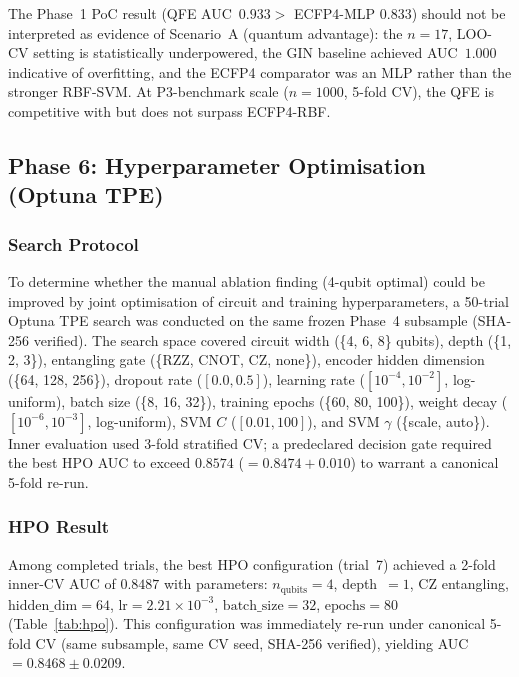 The Phase~1 PoC result (QFE AUC~$0.933 >$ ECFP4-MLP $0.833$) should not be
interpreted as evidence of Scenario~A (quantum advantage): the $n = 17$,
LOO-CV setting is statistically underpowered, the GIN baseline achieved
AUC~$1.000$ indicative of overfitting, and the ECFP4 comparator was an MLP
rather than the stronger RBF-SVM. At P3-benchmark scale ($n = 1000$,
5-fold CV), the QFE is competitive with but does not surpass ECFP4-RBF.


\subsection{Phase 6: Hyperparameter Optimisation (Optuna TPE)}

\subsubsection{Search Protocol}

To determine whether the manual ablation finding (4-qubit optimal) could be
improved by joint optimisation of circuit and training hyperparameters, a
50-trial Optuna TPE search was conducted on the same frozen Phase~4 subsample
(SHA-256 verified). The search space covered circuit width (\{4, 6, 8\}
qubits), depth (\{1, 2, 3\}), entangling gate (\{RZZ, CNOT, CZ, none\}),
encoder hidden dimension (\{64, 128, 256\}), dropout rate ($[0.0, 0.5]$),
learning rate ($[10^{-4}, 10^{-2}]$, log-uniform), batch size (\{8, 16, 32\}),
training epochs (\{60, 80, 100\}), weight decay ($[10^{-6}, 10^{-3}]$,
log-uniform), SVM $C$ ($[0.01, 100]$), and SVM $\gamma$ (\{scale, auto\}).
Inner evaluation used 3-fold stratified CV; a predeclared decision gate
required the best HPO AUC to exceed $0.8574$ ($= 0.8474 + 0.010$) to
warrant a canonical 5-fold re-run.

\subsubsection{HPO Result}

Among completed trials, the best HPO configuration (trial~7) achieved a
2-fold inner-CV AUC of $0.8487$ with parameters: $n_{\text{qubits}} = 4$,
depth~$= 1$, CZ entangling, $\text{hidden\_dim} = 64$,
$\text{lr} = 2.21 \times 10^{-3}$, $\text{batch\_size} = 32$,
$\text{epochs} = 80$ (Table~\ref{tab:hpo}). This configuration was
immediately re-run under canonical 5-fold CV (same subsample, same CV
seed, SHA-256 verified), yielding AUC $= 0.8468 \pm 0.0209$.

